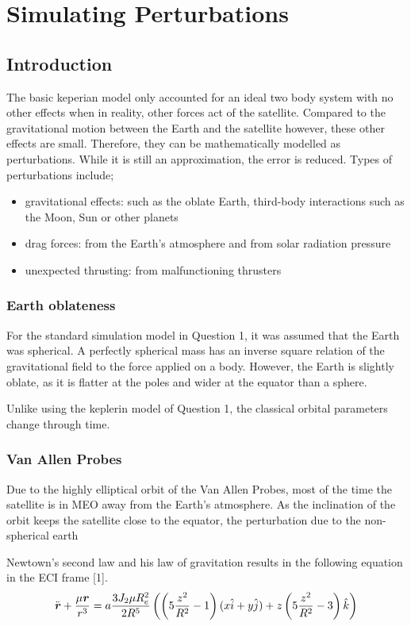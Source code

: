 \documentclass[Space3_Assign1.tex]{subfiles}
\begin{document}
\newpage
\section{Simulating Perturbations}

\subsection{Introduction}
The basic keperian model only accounted for an ideal two body system with no other effects when in reality, other forces act of the satellite. Compared to the gravitational motion between the Earth and the satellite however, these other effects are small. Therefore, they can be mathematically modelled as perturbations. While it is still an approximation, the error is reduced. Types of perturbations include;
\begin{itemize}
\item gravitational effects: such as the oblate Earth, third-body interactions such as the Moon, Sun or other planets
\item drag forces: from the Earth's atmosphere and from solar radiation pressure
\item unexpected thrusting: from malfunctioning thrusters
\end{itemize} 


\subsubsection{Earth oblateness}
For the standard simulation model in Question 1, it was assumed that the Earth was spherical. A perfectly spherical mass has an inverse square relation of the gravitational field to the force applied on a body. However, the Earth is slightly oblate, as it is flatter at the poles and wider at the equator than a sphere. 

Unlike using the keplerin model of Question 1, the classical orbital parameters change through time.

\subsubsection{Van Allen Probes}
Due to the highly elliptical orbit of the Van Allen Probes, most of the time the satellite is in MEO away from the Earth's atmosphere. As the inclination of the orbit keeps the satellite close to the equator, the perturbation due to the non-spherical earth 

Newtown's second law and his law of gravitation results in the following equation in the ECI frame [1].
\begin{eqnarray}
\ddot{\textbf{\textit{r}}}+\frac{\mu\textbf{\textit{r}}}{r^3} = a\frac{3J_2\mu R_e^2}{2R^5}\left( \left( 5\frac{z^2}{R^2}-1 \right)(x\hat{i}+y\hat{j}) + z\left( 5\frac{z^2}{R^2}-3 \right)\hat{k} \right) 
\end{eqnarray}
\end{document}
